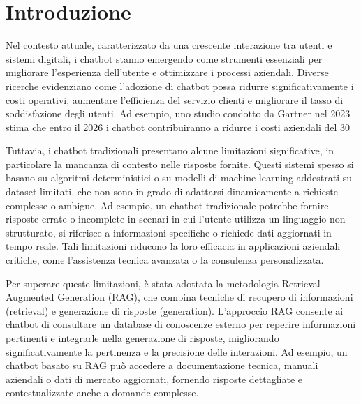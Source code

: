 \documentclass[a4paper,twoside,12pt]{toptesi}
\makeatletter
\def\cleardoublepage{\clearpage\if@twoside \ifodd\c@page\else
    \hbox{}
    \vspace*{\fill}
    \vspace{\fill}
    \thispagestyle{empty}
    \newpage
    \if@twocolumn\hbox{}\newpage\fi\fi\fi}
\makeatother
\begin{document}
\tableofcontents

\cleardoublepage

\setcounter{page}{1}

\chapter{Introduzione}
Nel contesto attuale, caratterizzato da una crescente interazione tra utenti e sistemi digitali, i chatbot stanno emergendo come strumenti essenziali per migliorare l’esperienza dell’utente e ottimizzare i processi aziendali. Diverse ricerche evidenziano come l’adozione di chatbot possa ridurre significativamente i costi operativi, aumentare l’efficienza del servizio clienti e migliorare il tasso di soddisfazione degli utenti. Ad esempio, uno studio condotto da Gartner nel 2023 stima che entro il 2026 i chatbot contribuiranno a ridurre i costi aziendali del 30%

Tuttavia, i chatbot tradizionali presentano alcune limitazioni significative, in particolare la mancanza di contesto nelle risposte fornite. Questi sistemi spesso si basano su algoritmi deterministici o su modelli di machine learning addestrati su dataset limitati, che non sono in grado di adattarsi dinamicamente a richieste complesse o ambigue. Ad esempio, un chatbot tradizionale potrebbe fornire risposte errate o incomplete in scenari in cui l’utente utilizza un linguaggio non strutturato, si riferisce a informazioni specifiche o richiede dati aggiornati in tempo reale. Tali limitazioni riducono la loro efficacia in applicazioni aziendali critiche, come l’assistenza tecnica avanzata o la consulenza personalizzata.

Per superare queste limitazioni, è stata adottata la metodologia Retrieval-Augmented Generation (RAG), che combina tecniche di recupero di informazioni (retrieval) e generazione di risposte (generation). L’approccio RAG consente ai chatbot di consultare un database di conoscenze esterno per reperire informazioni pertinenti e integrarle nella generazione di risposte, migliorando significativamente la pertinenza e la precisione delle interazioni. Ad esempio, un chatbot basato su RAG può accedere a documentazione tecnica, manuali aziendali o dati di mercato aggiornati, fornendo risposte dettagliate e contestualizzate anche a domande complesse.
\end{document}
